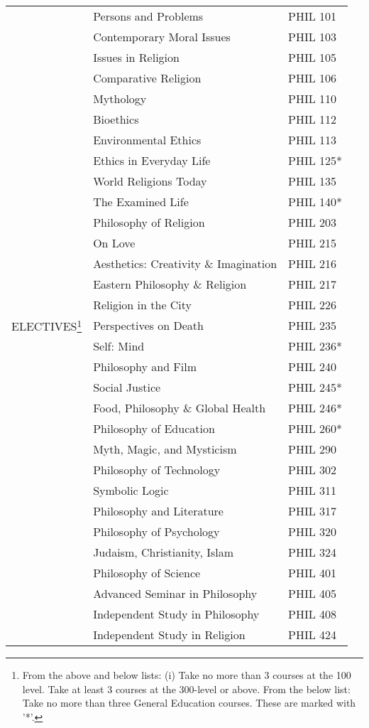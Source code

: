 \documentclass[oneside]{article}
\begin{document}
\begin{center}
\begin{tabular}{ |l|l|l| }
 \multirow{31}{*}{ELECTIVES\footnote{From the above and below lists: (i) Take no more than 3 courses at the 100 level. Take at least 3 courses at the 300-level or above. From the below list: Take no more than three General Education courses. These are marked with '*'. }}  
 & Persons and Problems & PHIL 101\\
 & Contemporary Moral Issues & PHIL 103\\
 & Issues in Religion & PHIL 105\\
 & Comparative Religion & PHIL 106\\
 & Mythology & PHIL 110\\
  &  Bioethics & PHIL 112 \\
 & Environmental Ethics & PHIL 113 \\
 &  Ethics in Everyday Life & PHIL 125* \\
 & World Religions Today & PHIL 135 \\
& The Examined Life & PHIL 140* \\
  & Philosophy of Religion & PHIL 203  \\
 & On Love & PHIL 215  \\
  & Aesthetics: Creativity \& Imagination & PHIL 216  \\
   & Eastern Philosophy \& Religion & PHIL 217  \\
  & Religion in the City & PHIL 226  \\
  & Perspectives on Death & PHIL 235 \\
  & Self: Mind & PHIL 236*\\
  & Philosophy and Film & PHIL 240 \\
    & Social Justice & PHIL 245* \\
 & Food, Philosophy \& Global Health & PHIL 246* \\
  & Philosophy of Education & PHIL 260* \\
     & Myth, Magic, and Mysticism & PHIL 290 \\
 & Philosophy of Technology & PHIL 302 \\ 
  & Symbolic Logic & PHIL 311 \\
& Philosophy and Literature & PHIL 317 \\
   & Philosophy of Psychology & PHIL 320 \\ 
        & Judaism, Christianity, Islam & PHIL 324 \\ 
    & Philosophy of Science & PHIL 401 \\ 
     & Advanced Seminar in Philosophy & PHIL 405 \\
   & Independent Study in Philosophy & PHIL 408\\
   & Independent Study in Religion & PHIL 424 \\ \hline
\end{tabular}
\end{center}
\end{document}
